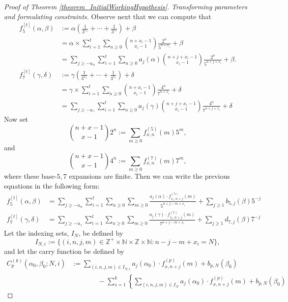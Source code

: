 \documentclass[12pt]{article}
\begin{document}
\begin{proof}[Proof of Theorem \ref{theorem_InitialWorkingHypothesis}]
\bigskip\noindent
\textit{Transforming parameters and formulating constraints.} 
Observe next that we can compute that 
\begin{align*} 
f_5^{[t]}(\alpha,\beta) & := \alpha\left(\frac{1}{3^{x_1}}+\cdots+\frac{1}{3^{x_t}}\right) + \beta \\ 
     & = \alpha \times \sum_{i=1}^t \sum_{n \geq 0} \binom{n+x_i-1}{x_i-1} \frac{2^n}{5^{n+x_i}} + \beta \\ 
     & = 
      \sum_{j \geq -u_{\alpha}} \sum_{i=1}^t \sum_{n \geq 0} a_j(\alpha) 
      \binom{n+j+x_i-1}{x_i-1} \frac{2^n}{5^{n+j+x_i}} + \beta. \\ 
f_7^{[t]}(\gamma,\delta) & := \gamma\left(\frac{1}{3^{x_1}}+\cdots+\frac{1}{3^{x_t}}\right) + \delta \\ 
     & = \gamma \times \sum_{i=1}^t \sum_{n \geq 0} \binom{n+x_i-1}{x_i-1} \frac{4^n}{7^{n+x_i}} + \delta \\ 
     & = 
      \sum_{j \geq -u_{\gamma}} \sum_{i=1}^t \sum_{n \geq 0} a_j(\gamma) 
      \binom{n+j+x_i-1}{x_i-1} \frac{4^n}{7^{n+j+x_i}} + \delta
\end{align*} 
Now set $$\binom{n+x-1}{x-1} 2^n := \sum_{m \geq 0} f_{x,n}^{(5)}(m) 5^m,$$ and 
$$\binom{n+x-1}{x-1} 4^n := \sum_{m \geq 0} f_{x,n}^{(7)}(m) 7^m,$$
where these base-$5,7$ expansions 
are finite. Then we can write the previous equations in the following form: 
\begin{align*} 
f_5^{[t]}(\alpha,\beta) & = 
      \sum_{j \geq -u_{\alpha}} \sum_{i=1}^t \sum_{n \geq 0} \sum_{m \geq 0} 
      \frac{a_j(\alpha) \cdot f_{x_i,n+j}^{(5)}(m)}{5^{n+j-m+x_i}} + 
      \sum_{j \geq 1} b_{5,j}(\beta) 5^{-j} \\ 
f_7^{[t]}(\gamma,\delta) & = 
      \sum_{j \geq -u_{\gamma}} \sum_{i=1}^t \sum_{n \geq 0} \sum_{m \geq 0} 
      \frac{a_j(\gamma) \cdot f_{x_i,n+j}^{(7)}(m)}{7^{n+j-m+x_i}} + 
      \sum_{j \geq 1} d_{7,j}(\beta) 7^{-j} 
\end{align*} 
Let the indexing sets, $I_N$, be defined by 
\[
I_{N,i} := \{(i,n,j,m) \in \mathbb{Z}^+ \times \mathbb{N} \times 
     \mathbb{Z} \times 
     \mathbb{N}: n-j-m+x_i = N\}, 
\] 
and let the carry function be defined by 
\begin{align*} 
C_p^{(k)}(\alpha_0,\beta_0; N, i) & := \sum_{(i,n,j,m) \in I_{N,i}} a_j(\alpha_0) \cdot 
     f_{x,n+j}^{(p)}(m)+b_{p,N}(\beta_0) \\ 
     & \phantom{:=\qquad\ } - 
     \sum_{s=1}^k \left\{\sum_{(i,n,j,m) \in I_N} a_j(\alpha_0) \cdot f_{x,n+j}^{(p)}(m)+b_{p,N}(\beta_0) 

\end{align*}
\end{proof}
\end{document}
